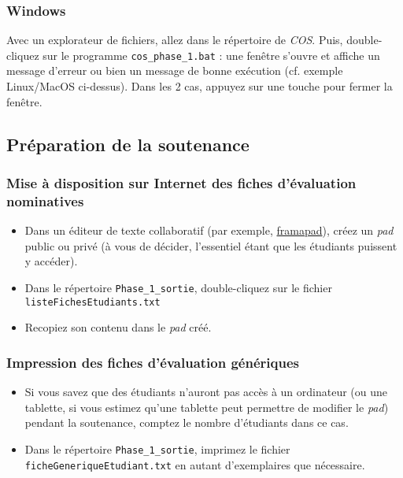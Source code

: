 \documentclass[11pt]{article}
\begin{document}
\subsubsection{Windows}
\label{sec-4-2-2}
Avec un explorateur de fichiers, allez dans le répertoire de
\emph{COS}. Puis, double-cliquez sur le programme \verb~cos_phase_1.bat~ : une
fenêtre s'ouvre et affiche un message d'erreur ou bien un message de
bonne exécution (cf. exemple Linux/MacOS ci-dessus). Dans les 2 cas,
appuyez sur une touche pour fermer la fenêtre.
\subsection{Préparation de la soutenance}
\label{sec-4-3}
\subsubsection{Mise à disposition sur Internet des fiches d'évaluation nominatives}
\label{sec-4-3-1}
\begin{itemize}
\item Dans un éditeur de texte collaboratif (par exemple, \href{https://framapad.org/}{framapad}), créez
un \emph{pad} public ou privé (à vous de décider, l'essentiel étant que
les étudiants puissent y accéder).
\item Dans le répertoire \verb~Phase_1_sortie~, double-cliquez sur le fichier
\verb~listeFichesEtudiants.txt~
\item Recopiez son contenu dans le \emph{pad} créé.
\end{itemize}
\subsubsection{Impression des fiches d'évaluation génériques}
\label{sec-4-3-2}
\begin{itemize}
\item Si vous savez que des étudiants n'auront pas accès à un ordinateur
(ou une tablette, si vous estimez qu'une tablette peut permettre de
modifier le \emph{pad}) pendant la soutenance, comptez le nombre
d'étudiants dans ce cas.
\item Dans le répertoire \verb~Phase_1_sortie~, imprimez le fichier
\verb~ficheGeneriqueEtudiant.txt~ en autant d'exemplaires que nécessaire.
\end{itemize}
\end{document}
